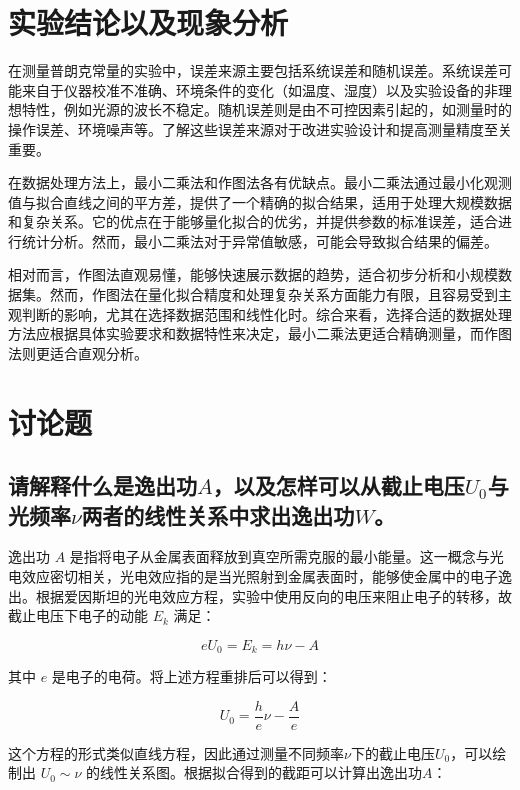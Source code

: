 \documentclass{ctexart}
\begin{document}
\section{实验结论以及现象分析}


在测量普朗克常量的实验中，误差来源主要包括系统误差和随机误差。系统误差可能来自于仪器校准不准确、环境条件的变化（如温度、湿度）以及实验设备的非理想特性，例如光源的波长不稳定。随机误差则是由不可控因素引起的，如测量时的操作误差、环境噪声等。了解这些误差来源对于改进实验设计和提高测量精度至关重要。

在数据处理方法上，最小二乘法和作图法各有优缺点。最小二乘法通过最小化观测值与拟合直线之间的平方差，提供了一个精确的拟合结果，适用于处理大规模数据和复杂关系。它的优点在于能够量化拟合的优劣，并提供参数的标准误差，适合进行统计分析。然而，最小二乘法对于异常值敏感，可能会导致拟合结果的偏差。

相对而言，作图法直观易懂，能够快速展示数据的趋势，适合初步分析和小规模数据集。然而，作图法在量化拟合精度和处理复杂关系方面能力有限，且容易受到主观判断的影响，尤其在选择数据范围和线性化时。综合来看，选择合适的数据处理方法应根据具体实验要求和数据特性来决定，最小二乘法更适合精确测量，而作图法则更适合直观分析。

\section{讨论题}

\subsection{请解释什么是逸出功$A$，以及怎样可以从截止电压$U_0$与光频率$\nu$两者的线性关系中求出逸出功$W$。}

逸出功 $A$ 是指将电子从金属表面释放到真空所需克服的最小能量。这一概念与光电效应密切相关，光电效应指的是当光照射到金属表面时，能够使金属中的电子逸出。根据爱因斯坦的光电效应方程，实验中使用反向的电压来阻止电子的转移，故截止电压下电子的动能 $E_k$ 满足：

$$ eU_0 = E_k = h\nu - A $$

其中 \( e \) 是电子的电荷。将上述方程重排后可以得到：

$$ U_0 = \frac{h}{e}\nu - \frac{A}{e} $$

这个方程的形式类似直线方程，因此通过测量不同频率$\nu$下的截止电压$U_0$，可以绘制出 $U_0 \sim \nu$ 的线性关系图。根据拟合得到的截距可以计算出逸出功$A$：
\end{document}
